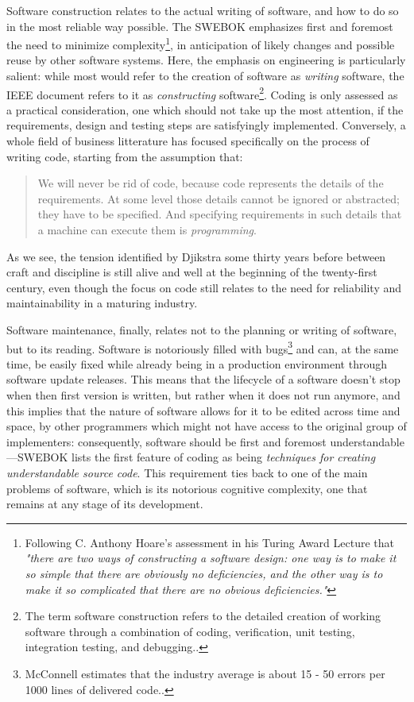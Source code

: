 Software construction relates to the actual writing of software, and how to do so in the most reliable way possible. The SWEBOK emphasizes first and foremost the need to minimize complexity\footnote{Following C. Anthony Hoare's assessment in his Turing Award Lecture that \emph{"there are two ways of constructing a software design: one way is to make it so simple that there are obviously no deficiencies, and the other way is to make it so complicated that there are no obvious deficiencies."}}, in anticipation of likely changes and possible reuse by other software systems. Here, the emphasis on engineering is particularly salient: while most would refer to the creation of software as \emph{writing} software, the IEEE document refers to it as \emph{constructing} software\footnote{The term software construction refers to the detailed creation of working software through a combination of coding, verification, unit testing, integration testing, and debugging.\cite{bourque_swebok_2014}.}. Coding is only assessed as a practical consideration, one which should not take up the most attention, if the requirements, design and testing steps are satisfyingly implemented. Conversely, a whole field of business litterature\cite{martin_clean_2008,hendrickson_software_2002,fowler_refactoring_1999,mcconnell_code_2004} has focused specifically on the process of writing code, starting from the assumption that:

\begin{quote}
  We will never be rid of code, because code represents the details of the requirements. At some level those details cannot be ignored or abstracted; they have to be specified. And specifying requirements in such details that a machine can execute them is \emph{programming}.\cite{martin_clean_2008}
\end{quote}

As we see, the tension identified by Djikstra some thirty years before between craft and discipline is still alive and well at the beginning of the twenty-first century, even though the focus on code still relates to the need for reliability and maintainability in a maturing industry.

Software maintenance, finally, relates not to the planning or writing of software, but to its reading. Software is notoriously filled with bugs\footnote{McConnell estimates that the industry average is about 15 - 50 errors per 1000 lines of delivered code.\cite{mcconnell_code_2004}.} and can, at the same time, be easily fixed while already being in a production environment through software update releases. This means that the lifecycle of a software doesn't stop when then first version is written, but rather when it does not run anymore, and this implies that the nature of software allows for it to be edited across time and space, by other programmers which might not have access to the original group of implementers: consequently, software should be first and foremost understandable—SWEBOK lists the first feature of coding as being \emph{techniques for creating understandable source code}\cite{bourque_swebok_2014}. This requirement ties back to one of the main problems of software, which is its notorious cognitive complexity, one that remains at any stage of its development.

